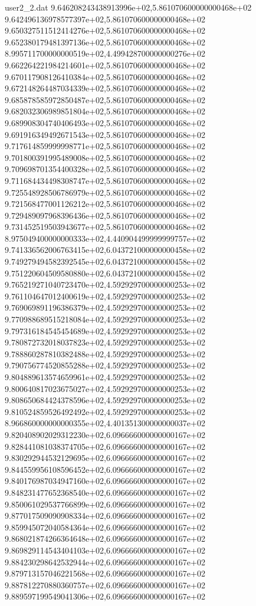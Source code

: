\begin{filecontents}{user2_2.dat}
9.646208243438913996e+02,5.861070600000000468e+02
9.642496136978577397e+02,5.861070600000000468e+02
9.650327511512414276e+02,5.861070600000000468e+02
9.652380179481397136e+02,5.861070600000000468e+02
8.995711700000000519e+02,4.499428700000000276e+02
9.662264221984214601e+02,5.861070600000000468e+02
9.670117908126410384e+02,5.861070600000000468e+02
9.672148264487034339e+02,5.861070600000000468e+02
9.685878585972850487e+02,5.861070600000000468e+02
9.682032306989851804e+02,5.861070600000000468e+02
9.689908304740406493e+02,5.861070600000000468e+02
9.691916349492671543e+02,5.861070600000000468e+02
9.717614859999998771e+02,5.861070600000000468e+02
9.701800391995489008e+02,5.861070600000000468e+02
9.709698701354400328e+02,5.861070600000000468e+02
9.711684434498308747e+02,5.861070600000000468e+02
9.725548928506786979e+02,5.861070600000000468e+02
9.721568477001126212e+02,5.861070600000000468e+02
9.729489097968396436e+02,5.861070600000000468e+02
9.731452519503943677e+02,5.861070600000000468e+02
8.975049400000000333e+02,4.440904499999999757e+02
9.741336562006763415e+02,6.043721000000000458e+02
9.749279494582392545e+02,6.043721000000000458e+02
9.751220604509580880e+02,6.043721000000000458e+02
9.765219271040723470e+02,4.592929700000000253e+02
9.761104647012400619e+02,4.592929700000000253e+02
9.769069891196386379e+02,4.592929700000000253e+02
9.770988689515218084e+02,4.592929700000000253e+02
9.797316184545454689e+02,4.592929700000000253e+02
9.780872732018037823e+02,4.592929700000000253e+02
9.788860287810382488e+02,4.592929700000000253e+02
9.790756774520855288e+02,4.592929700000000253e+02
9.804889613574659961e+02,4.592929700000000253e+02
9.800640817023675027e+02,4.592929700000000253e+02
9.808650684424378596e+02,4.592929700000000253e+02
9.810524859526492492e+02,4.592929700000000253e+02
8.966860000000000355e+02,4.401351300000000037e+02
9.820408902029312230e+02,6.096666000000000167e+02
9.828441081038374705e+02,6.096666000000000167e+02
9.830292944532129695e+02,6.096666000000000167e+02
9.844559956108596452e+02,6.096666000000000167e+02
9.840176987034947160e+02,6.096666000000000167e+02
9.848231477652368540e+02,6.096666000000000167e+02
9.850061029537766899e+02,6.096666000000000167e+02
9.877017509090908334e+02,6.096666000000000167e+02
9.859945072040584364e+02,6.096666000000000167e+02
9.868021874266364648e+02,6.096666000000000167e+02
9.869829114543404103e+02,6.096666000000000167e+02
9.884230298642532944e+02,6.096666000000000167e+02
9.879713157046221568e+02,6.096666000000000167e+02
9.887812270880360757e+02,6.096666000000000167e+02
9.889597199549041306e+02,6.096666000000000167e+02

\end{filecontents}
